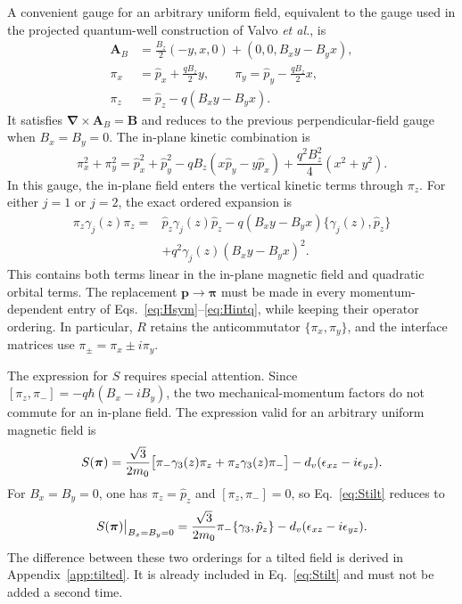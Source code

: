 A convenient gauge for an arbitrary uniform field, equivalent to the gauge used in the projected quantum-well construction of Valvo \emph{et al.}, is
\begin{equation}
\begin{aligned}
\bm A_B&=\frac{B_z}{2}(-y,x,0)+(0,0,B_xy-B_yx),\\
\pi_x&= \hat{p}_ x+\frac{qB_z}{2}y,\qquad
\pi_y= \hat{p}_ y-\frac{qB_z}{2}x,\\
\pi_z&= \hat{p}_ z-q(B_xy-B_yx).
\end{aligned}
\label{eq:gauge}
\end{equation}
It satisfies $\bm\nabla\times\bm A_B=\bm B$ and reduces to the previous perpendicular-field gauge when $B_x=B_y=0$. The in-plane kinetic combination is
\begin{equation}
\pi_x^2+\pi_y^2
= \hat{p}_ x^2+ \hat{p}_ y^2-qB_z(x \hat{p}_ y-y \hat{p}_ x)
+\frac{q^2B_z^2}{4}(x^2+y^2).
\label{eq:orbitalexpansion}
\end{equation}
In this gauge, the in-plane field enters the vertical kinetic terms through $\pi_z$. For either $j=1$ or $j=2$, the exact ordered expansion is
\begin{equation}
\begin{aligned}
\pi_z\gamma_j(z)\pi_z
={}& \hat{p}_ z\gamma_j(z) \hat{p}_ z
-q(B_xy-B_yx)\{\gamma_j(z), \hat{p}_ z\}\\
&+q^2\gamma_j(z)(B_xy-B_yx)^2.
\end{aligned}
\label{eq:tiltedkinetic}
\end{equation}
This contains both terms linear in the in-plane magnetic field and quadratic orbital terms. The replacement $\bm p\to\bm\pi$ must be made in every momentum-dependent entry of Eqs.~\eqref{eq:Hsym}--\eqref{eq:Hintq}, while keeping their operator ordering. In particular, $R$ retains the anticommutator $\{\pi_x,\pi_y\}$, and the interface matrices use $\pi_\pm=\pi_x\pm i\pi_y$.

The expression for $S$ requires special attention. Since $[\pi_z,\pi_-]=-q\hbar(B_x-iB_y)$, the two mechanical-momentum factors do not commute for an in-plane field. The expression valid for an arbitrary uniform magnetic field is
\begin{equation}
S(\bm\pi)=\frac{\sqrt3}{2m_0}
\bigl[\pi_-\gamma_3(z)\pi_z+\pi_z\gamma_3(z)\pi_-\bigr]
-d_v(\epsilon_ {xz}-i\epsilon_ {yz}).
\label{eq:Stilt}
\end{equation}
For $B_x=B_y=0$, one has $\pi_z= \hat{p}_ z$ and $[\pi_z,\pi_-]=0$, so Eq.~\eqref{eq:Stilt} reduces to
\begin{equation}
S(\bm\pi)\big|_{B_x=B_y=0}
=\frac{\sqrt3}{2m_0}\pi_-\{\gamma_3, \hat{p}_ z\}
-d_v(\epsilon_ {xz}-i\epsilon_ {yz}).
\label{eq:SBz}
\end{equation}
The difference between these two orderings for a tilted field is derived in Appendix~\ref{app:tilted}. It is already included in Eq.~\eqref{eq:Stilt} and must not be added a second time.

